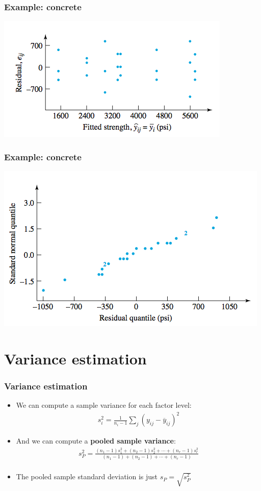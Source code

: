 \documentclass[handout]{beamer}\usepackage[]{graphicx}\usepackage[]{color}
\providecommand{\ov}[1]{\overline{#1}}
\numberwithin{equation}{section}
\begin{document}
\begin{frame}
\frametitle{Example: concrete}
\begin{center}
 \includegraphics{../../fig/concreteres2.png}
\end{center}
\end{frame}

\begin{frame}
\frametitle{Example: concrete}
\begin{center}
 \includegraphics{../../fig/concreteres3.png}
\end{center}
\end{frame}

\section{Variance estimation}


\begin{frame}
\frametitle{Variance estimation}
\begin{itemize}
\item We can compute a sample variance for each factor level:
\begin{align*}
s_i^2 = \frac{1}{n_i - 1}  \sum_j (y_{ij} - \ov{y}_{ij})^2
\end{align*}
\pause \item And we can compute a {\bf pooled sample variance}:
\begin{align*}
s_P^2 = \frac{(n_1 - 1)s_1^2 + (n_2 - 1)s_2^2 + \cdots + (n_r - 1)s_r^2}{(n_1 - 1) + (n_2 - 1) + \cdots + (n_r - 1)} \\
\end{align*}
\pause \item The pooled sample standard deviation is just $s_P = \sqrt{s_P^2}$
\end{itemize}
\end{frame}
\end{document}
